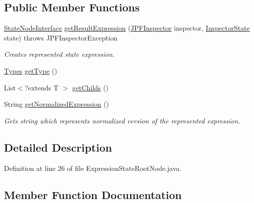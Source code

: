 \subsection*{Public Member Functions}
\begin{DoxyCompactItemize}
\item 
\hyperlink{interfacegov_1_1nasa_1_1jpf_1_1inspector_1_1server_1_1programstate_1_1_state_node_interface}{State\+Node\+Interface} \hyperlink{interfacegov_1_1nasa_1_1jpf_1_1inspector_1_1server_1_1expression_1_1_expression_state_root_node_ab4b2088b28e070af5102f32a85721c6c}{get\+Result\+Expression} (\hyperlink{classgov_1_1nasa_1_1jpf_1_1inspector_1_1server_1_1jpf_1_1_j_p_f_inspector}{J\+P\+F\+Inspector} inspector, \hyperlink{interfacegov_1_1nasa_1_1jpf_1_1inspector_1_1server_1_1expression_1_1_inspector_state}{Inspector\+State} state)  throws J\+P\+F\+Inspector\+Exception
\begin{DoxyCompactList}\small\item\em Creates represented state expression. \end{DoxyCompactList}\item 
\hyperlink{enumgov_1_1nasa_1_1jpf_1_1inspector_1_1server_1_1expression_1_1_types}{Types} \hyperlink{interfacegov_1_1nasa_1_1jpf_1_1inspector_1_1server_1_1expression_1_1_expression_node_interface_a5799ecbb793f24840fa3e2eaedc799aa}{get\+Type} ()
\item 
List$<$?extends T $>$ \hyperlink{interfacegov_1_1nasa_1_1jpf_1_1inspector_1_1server_1_1expression_1_1_expression_node_interface_aaeec5305da52fbad211a7abf22b0a854}{get\+Childs} ()
\item 
String \hyperlink{interfacegov_1_1nasa_1_1jpf_1_1inspector_1_1server_1_1expression_1_1_expression_node_interface_ae5387d8da0126c1256a786d54b9bd7ce}{get\+Normalized\+Expression} ()
\begin{DoxyCompactList}\small\item\em Gets string which represents normalized version of the represented expression. \end{DoxyCompactList}\end{DoxyCompactItemize}


\subsection{Detailed Description}


Definition at line 26 of file Expression\+State\+Root\+Node.\+java.



\subsection{Member Function Documentation}
